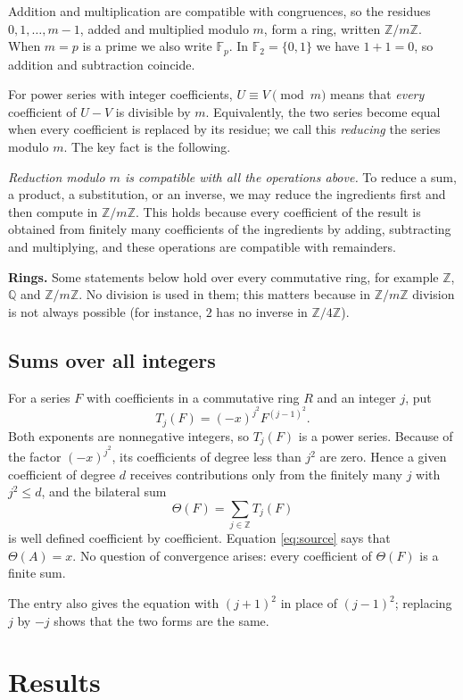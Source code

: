 \documentclass[11pt,a4paper]{article}
\theoremstyle{definition}
\theoremstyle{remark}
\newcommand{\Z}{\mathbb{Z}}
\newcommand{\Q}{\mathbb{Q}}
\newcommand{\F}{\mathbb{F}}
\newcommand{\para}[1]{\par\medskip\noindent\textbf{#1}\enspace}
\begin{document}
Addition and multiplication are compatible with congruences, so the residues $0,1,\dots,m-1$, added and multiplied
modulo $m$, form a ring, written $\Z/m\Z$. When $m=p$ is a prime we also write $\F_p$. In $\F_2=\{0,1\}$ we have $1+1=0$,
so addition and subtraction coincide.

For power series with integer coefficients, $U\equiv V\pmod m$ means that \emph{every} coefficient of $U-V$ is
divisible by $m$. Equivalently, the two series become equal when every coefficient is replaced by its residue; we call
this \emph{reducing} the series modulo $m$. The key fact is the following.

\emph{Reduction modulo $m$ is compatible with all the operations above.} To reduce a sum, a product, a substitution, or
an inverse, we may reduce the ingredients first and then compute in $\Z/m\Z$. This holds because every
coefficient of the result is obtained from finitely many coefficients of the ingredients by adding, subtracting and
multiplying, and these operations are compatible with remainders.

\para{Rings.} Some statements below hold over every commutative ring, for example $\Z$, $\Q$ and $\Z/m\Z$. No
division is used in them; this matters because in $\Z/m\Z$ division is not always possible (for instance, $2$ has no inverse in
$\Z/4\Z$).

\subsection{Sums over all integers}
For a series $F$ with coefficients in a commutative ring $R$ and an integer $j$, put
\[
T_j(F)=(-x)^{j^2}F^{(j-1)^2}.
\]
Both exponents are nonnegative integers, so $T_j(F)$ is a power series. Because of the factor $(-x)^{j^2}$, its
coefficients of degree less than $j^2$ are zero. Hence a given coefficient of degree $d$ receives contributions only
from the finitely many $j$ with $j^2\le d$, and the bilateral sum
\[
\Theta(F)=\sum_{j\in\Z}T_j(F)
\]
is well defined coefficient by coefficient. Equation \eqref{eq:source} says that $\Theta(A)=x$. No question of
convergence arises: every coefficient of $\Theta(F)$ is a finite sum.

The entry also gives the equation with $(j+1)^2$ in place of $(j-1)^2$; replacing $j$ by $-j$ shows that the two forms
are the same.

\section{Results}\label{sec:results}
\end{document}
